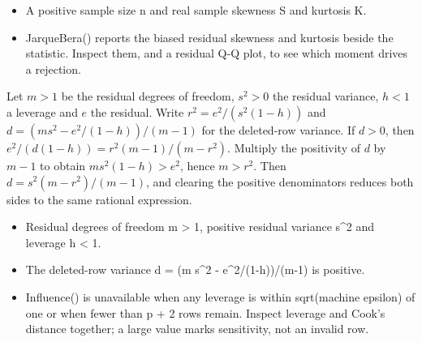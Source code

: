 \expandafter\def\csname statadic@assumptions@STATADIC-JB-001\endcsname{\begin{itemize}
\item A positive sample size n and real sample skewness S and kurtosis K.
\end{itemize}}
\expandafter\def\csname statadic@diagnostics@STATADIC-JB-001\endcsname{\begin{itemize}
\item JarqueBera() reports the biased residual skewness and kurtosis beside the statistic. Inspect them, and a residual Q-Q plot, to see which moment drives a rejection.
\end{itemize}}
\expandafter\def\csname statadic@statement@STATADIC-INFLUENCE-001\endcsname{Let $m>1$ be the residual degrees of freedom, $s^2>0$ the
  residual variance, $h<1$ a leverage and $e$ the residual. Write
  $r^2=e^2/(s^2(1-h))$ and $d=(ms^2-e^2/(1-h))/(m-1)$ for the deleted-row
  variance. If $d>0$, then $e^2/(d(1-h))=r^2(m-1)/(m-r^2)$.}
\expandafter\def\csname statadic@proof@STATADIC-INFLUENCE-001\endcsname{Multiply the positivity of $d$ by $m-1$ to obtain
  $ms^2(1-h)>e^2$, hence $m>r^2$. Then $d=s^2(m-r^2)/(m-1)$, and clearing the
  positive denominators reduces both sides to the same rational expression.}
\expandafter\def\csname statadic@assumptions@STATADIC-INFLUENCE-001\endcsname{\begin{itemize}
\item Residual degrees of freedom m > 1, positive residual variance s\textasciicircum{}2 and leverage h < 1.
\item The deleted-row variance d = (m s\textasciicircum{}2 - e\textasciicircum{}2/(1-h))/(m-1) is positive.
\end{itemize}}
\expandafter\def\csname statadic@diagnostics@STATADIC-INFLUENCE-001\endcsname{\begin{itemize}
\item Influence() is unavailable when any leverage is within sqrt(machine epsilon) of one or when fewer than p + 2 rows remain. Inspect leverage and Cook's distance together; a large value marks sensitivity, not an invalid row.
\end{itemize}}
\newcommand{\statadicstatement}[1]{\ifcsname statadic@statement@#1\endcsname\csname statadic@statement@#1\endcsname\else\PackageError{statadic}{Unknown statement #1}{Regenerate certified fragments}\fi}
\newcommand{\statadicproof}[1]{\ifcsname statadic@proof@#1\endcsname\csname statadic@proof@#1\endcsname\else\PackageError{statadic}{Unknown proof #1}{Regenerate certified fragments}\fi}
\newcommand{\statadicassumptions}[1]{\ifcsname statadic@assumptions@#1\endcsname\csname statadic@assumptions@#1\endcsname\else\PackageError{statadic}{Unknown assumptions #1}{Regenerate certified fragments}\fi}
\newcommand{\statadicdiagnostics}[1]{\ifcsname statadic@diagnostics@#1\endcsname\csname statadic@diagnostics@#1\endcsname\else\PackageError{statadic}{Unknown diagnostics #1}{Regenerate certified fragments}\fi}
